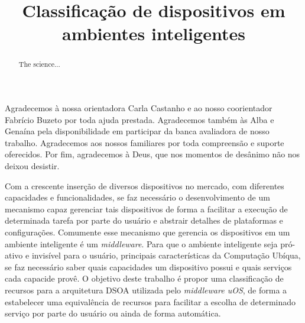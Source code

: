 \documentclass[bacharelado]{unb-cic}
\title{Classificação de dispositivos em ambientes inteligentes}
\begin{document}
  \lstset{tabsize=4}
  \renewcommand\lstlistingname{Listagem}
  \renewcommand\lstlistlistingname{Listagens}
  \maketitle
  \pretextual

  \begin{dedicatoria}
  
  \end{dedicatoria}

  \begin{agradecimentos}
  Agradecemos à nossa orientadora \dr[a] Carla Castanho e ao nosso coorientador Fabrício Buzeto por toda ajuda prestada. Agradecemos também às \dr[as] Alba e Genaína pela disponibilidade em participar da banca avaliadora de nosso trabalho. Agradecemos aos nossos familiares por toda compreensão e suporte oferecidos. Por fim, agradecemos à Deus, que nos momentos de desânimo não nos deixou desistir.
  \end{agradecimentos}

  \begin{resumo}
  Com a crescente inserção de diversos dispositivos no mercado, com diferentes capacidades e funcionalidades, se faz necessário o desenvolvimento de um mecanismo capaz gerenciar tais dispositivos de forma a facilitar a execução de determinada tarefa por parte do usuário e abstrair detalhes de plataformas e configurações. Comumente esse mecanismo que gerencia os dispositivos em um ambiente inteligente é um \emph{middleware}. Para que o ambiente inteligente seja pró-ativo e invisível para o usuário, principais características da Computação Ubíqua, se faz necessário saber quais capacidades um dispositivo possui e quais serviços cada capacide provê. O objetivo deste trabalho é propor uma classificação de recursos para a arquitetura DSOA utilizada pelo \emph{middleware uOS}, de forma a estabelecer uma equivalência de recursos para facilitar a escolha de determinado serviço por parte do usuário ou ainda de forma automática. 
  \end{resumo}

  \begin{abstract} 
  The science...
  \end{abstract}

  \tableofcontents
  \listoffigures
  \listoftables

  \textual
  
  
  
  
  

  \postextual
  
  
\end{document}
